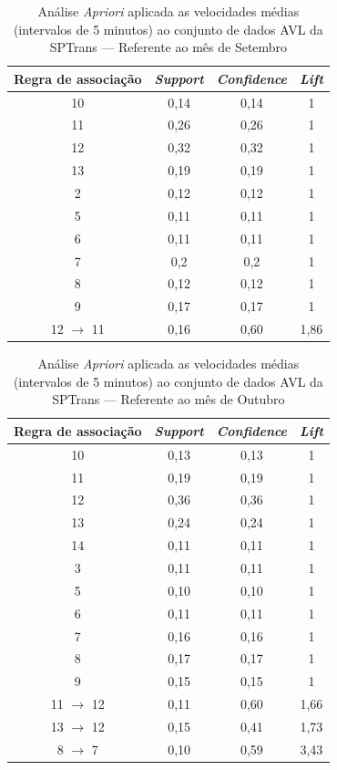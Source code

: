 \documentclass[
	12pt,				%
	oneside,			%
	a4paper,			%
	english,			%
	brazil				%
	]{abntex2ppgsi}
\begin{document}
{{{\begin{apendicesenv}
\begin{table}[!htb]
\centering
\caption {Análise \textit{Apriori} aplicada as velocidades médias (intervalos de 5 minutos) ao conjunto de dados AVL da SPTrans --- Referente ao mês de Setembro}
\label {tab:aprioriSeptember}
\begin{tabular}{c|c|c|c}
\toprule
\textbf{Regra de associação} & \textit{\textbf{Support}} & \textit{\textbf{Confidence}} & \textit{\textbf{Lift}} \\
\midrule
10 &  0,14 &  0,14 &  1\\
\hline
11 &  0,26 &  0,26 &  1\\
\hline
12 &  0,32 &  0,32 &  1\\
\hline
13 &  0,19 &  0,19 &  1\\
\hline
2 &  0,12 &  0,12 &  1\\
\hline
5 &  0,11 &  0,11 &  1\\
\hline
6 &  0,11 &  0,11 &  1\\
\hline
7 &  0,2 &  0,2 &  1\\
\hline
8 &  0,12 &  0,12 &  1\\
\hline
9 &  0,17 &  0,17 &  1\\
\hline
12 $\rightarrow$ 11 &  0,16 &  0,60 &  1,86\\
\bottomrule
\end{tabular}
\end{table}


\begin{table}[!htb]
\centering
\caption {Análise \textit{Apriori} aplicada as velocidades médias (intervalos de 5 minutos) ao conjunto de dados AVL da SPTrans --- Referente ao mês de Outubro}
\label {tab:aprioriOctober}
\begin{tabular}{c|c|c|c}
\toprule
\textbf{Regra de associação} & \textit{\textbf{Support}} & \textit{\textbf{Confidence}} & \textit{\textbf{Lift}} \\
\midrule
10 &  0,13 &  0,13 &  1\\
\hline
11 &  0,19 &  0,19 &  1\\
\hline
12 &  0,36 &  0,36 &  1\\
\hline
13 &  0,24 &  0,24 &  1\\
\hline
14 &  0,11 &  0,11 &  1\\
\hline
3 &  0,11 &  0,11 &  1\\
\hline
5 &  0,10 &  0,10 &  1\\
\hline
6 &  0,11 &  0,11 &  1\\
\hline
7 &  0,16 &  0,16 &  1\\
\hline
8 &  0,17 &  0,17 &  1\\
\hline
9 &  0,15 &  0,15 &  1\\
\hline
11 $\rightarrow$ 12 &  0,11 &  0,60 &  1,66\\
\hline
13 $\rightarrow$ 12 &  0,15 &  0,41 &  1,73\\
\hline
8 $\rightarrow$ 7 &  0,10 &  0,59 &  3,43\\
\bottomrule
\end{tabular}
\end{table}



\end{apendicesenv}}}}
\end{document}
